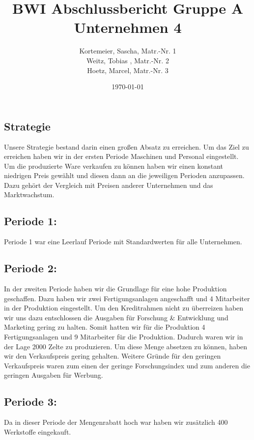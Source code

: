 \documentclass[a4paper, 12pt]{report}
\title{BWI Abschlussbericht Gruppe A Unternehmen 4}
\author{Kortemeier, Sascha, Matr.-Nr. 1 \\
Weitz, Tobias , Matr.-Nr. 2 \\
Hoetz, Marcel, Matr.-Nr. 3}
\date{\today}
\begin{document}
\maketitle
\tableofcontents



\begin{flushleft}
\chapter{Strategie}
Unsere Strategie bestand darin einen großen Absatz zu erreichen. 
Um das Ziel zu erreichen haben wir in der ersten Periode Maschinen und Personal eingestellt. 
Um die produzierte Ware verkaufen zu können haben wir einen konstant niedrigen Preis gewählt und diesen dann an die jeweiligen Perioden anzupassen. 
Dazu gehört der Vergleich mit Preisen anderer Unternehmen und das Marktwachstum. 

\section{Periode 1:}
Periode 1 war eine Leerlauf Periode mit Standardwerten für alle Unternehmen.	

\section{Periode 2:}
In der zweiten Periode haben wir die Grundlage für eine hohe Produktion geschaffen.
Dazu haben wir zwei Fertigungsanlagen angeschafft und 4 Mitarbeiter in der Produktion eingestellt.
Um den Kreditrahmen nicht zu überreizen haben wir uns dazu entschlossen die Ausgaben für Forschung \& Entwicklung und Marketing gering zu halten.
Somit hatten wir für die Produktion 4 Fertigungsanlagen und 9 Mitarbeiter für die Produktion.
Dadurch waren wir in der Lage 2000 Zelte zu produzieren.
Um diese Menge absetzen zu können, haben wir den Verkaufspreis gering gehalten.
Weitere Gründe für den geringen Verkaufspreis waren zum einen der geringe Forschungsindex und zum anderen die geringen Ausgaben für Werbung.

\section{Periode 3:}
Da in dieser Periode der Mengenrabatt hoch war haben wir zusätzlich 400 Werkstoffe eingekauft. 


\end{flushleft}
\end{document}
